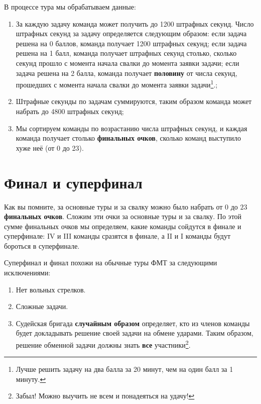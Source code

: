 \documentclass[12pt]{article}
\begin{document}
В процессе тура мы обрабатываем данные:
\begin{enumerate}
	\item За каждую задачу команда может получить до 1200 штрафных секунд. Число штрафных секунд за задачу определяется следующим образом: если задача решена на 0 баллов, команда получает 1200 штрафных секунд; если задача решена на 1 балл, команда получает штрафных секунд столько, сколько секунд прошло с момента начала свалки до момента заявки задачи; если задача решена на 2 балла, команда получает {\bf половину} от числа секунд, прошедших с момента начала свалки до момента заявки задачи\footnote{Лучше решить задачу на два балла за 20 минут, чем на один балл за 1 минуту.}.;
	\item Штрафные секунды по задачам суммируются, таким образом команда может набрать до 4800 штрафных секунд;
	\item Мы сортируем команды по возрастанию числа штрафных секунд, и каждая команда получает столько {\bf финальных очков}, сколько команд выступило хуже неё (от 0 до 23).
\end{enumerate}

\section*{Финал и суперфинал}
Как вы помните, за основные туры и за свалку можно было набрать от $0$ до $23$ {\bf финальных очков}. Сложим эти очки за основные туры и за свалку. По этой сумме финальных очков мы определяем, какие команды сойдутся в финале и суперфинале: IV и III команды сразятся в финале, а II и I команды будут бороться в суперфинале.

Суперфинал и финал похожи на обычные туры ФМТ за следующими исключениями:
\begin{enumerate}
\item Нет вольных стрелков.
\item Сложные задачи.
\item Судейская бригада {\bf случайным образом} определяет, кто из членов команды будет докладывать решение своей задачи на обмене ударами. Таким образом, решение обменной задачи должны знать {\bf все} участники\footnote{Забыл! Можно выучить не всем и понадеяться на удачу!}.
\end{enumerate}
\end{document}
